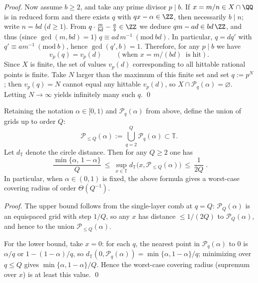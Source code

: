 \begin{proof}
\par
Now assume \(b\ge 2\), and take any prime divisor \(p\mid b\).
If \(x=m/n\in X\cap\QQ\) is in reduced form and there exists \(q\) with \(qx-\alpha\in\ZZ\), then necessarily \(b\mid n\);
write \(n=bd\) (\(d\ge 1\)). From
\(
q\cdot \frac{m}{bd}-\frac{a}{b}\in\ZZ
\)
we deduce
\(
qm-ad\in bd\,\ZZ
\),
and thus (since \(\gcd(m,bd)=1\)) \(q\equiv ad\,m^{-1}\ (\mathrm{mod}\ bd)\).
In particular, \(q=dq'\) with \(q'\equiv a m^{-1}\ (\mathrm{mod}\ b)\), hence \(\gcd(q',b)=1\).
Therefore, for any \(p\mid b\) we have
\[
v_p(q)=v_p(d)\qquad(\text{when }x=m/(bd)\ \text{ is hit}).
\]
Since \(X\) is finite, the set of values \(v_p(d)\) corresponding to all hittable rational points is finite.
Take \(N\) larger than the maximum of this finite set and set \(q:=p^{N}\);
then \(v_p(q)=N\) cannot equal any hittable \(v_p(d)\), so \(X\cap\mathcal P_q(\alpha)=\varnothing\).
Letting \(N\to\infty\) yields infinitely many such \(q\). \qed
\end{proof}

\begin{proposition}\label{prop:zeta-cyclic-lift-addressable-grid-covering-radius}
Retaining the notation \(\alpha\in[0,1)\) and \(\mathcal P_q(\alpha)\) from above, define the union of grids up to order \(Q\):
\[
\mathcal P_{\le Q}(\alpha):=\bigcup_{q=2}^{Q}\mathcal P_q(\alpha)\subset\mathbb T .
\]
Let \(d_{\mathbb T}\) denote the circle distance. Then for any \(Q\ge 2\) one has
\[
\boxed{\;
\frac{\min\{\alpha,\,1-\alpha\}}{Q}
\ \le\
\sup_{x\in\mathbb T} d_{\mathbb T}\bigl(x,\mathcal P_{\le Q}(\alpha)\bigr)
\ \le\
\frac{1}{2Q}\; }.
\]
In particular, when \(\alpha\in(0,1)\) is fixed, the above formula gives a worst-case covering radius of order \(\Theta(Q^{-1})\).
\end{proposition}
\begin{proof}
The upper bound follows from the single-layer comb at \(q=Q\): \(\mathcal P_Q(\alpha)\) is an equispaced grid with step \(1/Q\), so any \(x\) has distance \(\le 1/(2Q)\) to \(\mathcal P_Q(\alpha)\), and hence to the union \(\mathcal P_{\le Q}(\alpha)\).
\par
For the lower bound, take \(x=0\): for each \(q\), the nearest point in \(\mathcal P_q(\alpha)\) to \(0\) is \(\alpha/q\) or \(1-(1-\alpha)/q\), so
\(
d_{\mathbb T}(0,\mathcal P_q(\alpha))=\min\{\alpha,1-\alpha\}/q
\);
minimizing over \(q\le Q\) gives \(\min\{\alpha,1-\alpha\}/Q\).
Hence the worst-case covering radius (supremum over \(x\)) is at least this value. \qed
\end{proof}

